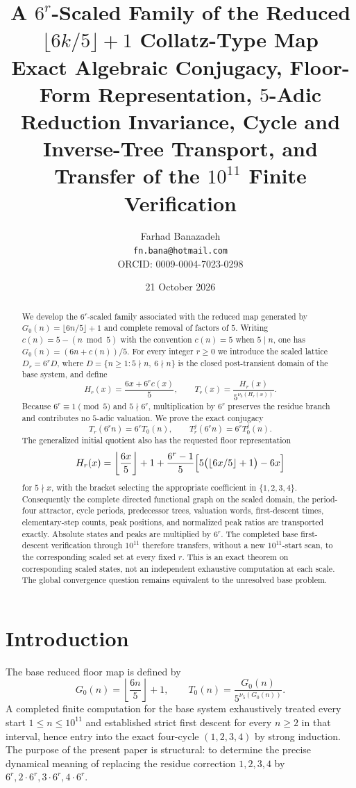 \documentclass[11pt]{article}
\title{A $6^r$-Scaled Family of the Reduced $\lfloor 6k/5\rfloor+1$ Collatz-Type Map\\[3pt]
\large Exact Algebraic Conjugacy, Floor-Form Representation, $5$-Adic Reduction Invariance, Cycle and Inverse-Tree Transport, and Transfer of the $10^{11}$ Finite Verification}
\author{Farhad Banazadeh\\\texttt{fn.bana@hotmail.com}\\ORCID: 0009-0004-7023-0298}
\date{21 October 2026}
\theoremstyle{remark}\newtheorem{remark}[theorem]{Remark}\newtheorem{example}[theorem]{Example}
\newcommand{\vfive}{\nu_5}
\begin{document}
\maketitle
\begin{abstract}
We develop the $6^r$-scaled family associated with the reduced map generated by
$G_0(n)=\lfloor 6n/5\rfloor+1$ and complete removal of factors of $5$.
Writing $c(n)=5-(n\bmod 5)$ with the convention $c(n)=5$ when $5\mid n$, one has
$G_0(n)=(6n+c(n))/5$. For every integer $r\ge0$ we introduce the scaled lattice
$D_r=6^rD$, where $D=\{n\ge1:5\nmid n,\ 6\nmid n\}$ is the closed post-transient domain of the base system, and define
\[
 H_r(x)=\frac{6x+6^r c(x)}5,\qquad T_r(x)=\frac{H_r(x)}{5^{\vfive(H_r(x))}}.
\]
Because $6^r\equiv1\pmod5$ and $5\nmid6^r$, multiplication by $6^r$ preserves the residue branch and contributes no $5$-adic valuation. We prove the exact conjugacy
\[
T_r(6^r n)=6^rT_0(n),\qquad T_r^j(6^r n)=6^rT_0^j(n).
\]
The generalized initial quotient also has the requested floor representation
\[
H_r(x)=\left\lfloor\frac{6x}{5}\right\rfloor+1+
\frac{6^r-1}{5}\Bigl[5\bigl(\lfloor6x/5\rfloor+1\bigr)-6x\Bigr]
\]
for $5\nmid x$, with the bracket selecting the appropriate coefficient in $\{1,2,3,4\}$.
Consequently the complete directed functional graph on the scaled domain, the period-four attractor, cycle periods, predecessor trees, valuation words, first-descent times, elementary-step counts, peak positions, and normalized peak ratios are transported exactly. Absolute states and peaks are multiplied by $6^r$.
The completed base first-descent verification through $10^{11}$ therefore transfers, without a new $10^{11}$-start scan, to the corresponding scaled set at every fixed $r$. This is an exact theorem on corresponding scaled states, not an independent exhaustive computation at each scale. The global convergence question remains equivalent to the unresolved base problem.
\end{abstract}

\section{Introduction}
The base reduced floor map is defined by
\[
G_0(n)=\left\lfloor\frac{6n}{5}\right\rfloor+1,
\qquad T_0(n)=\frac{G_0(n)}{5^{\vfive(G_0(n))}}.
\]
A completed finite computation for the base system exhaustively treated every start $1\le n\le10^{11}$ and established strict first descent for every $n\ge2$ in that interval, hence entry into the exact four-cycle $(1,2,3,4)$ by strong induction. The purpose of the present paper is structural: to determine the precise dynamical meaning of replacing the residue correction $1,2,3,4$ by $6^r,2\cdot6^r,3\cdot6^r,4\cdot6^r$.
\end{document}

